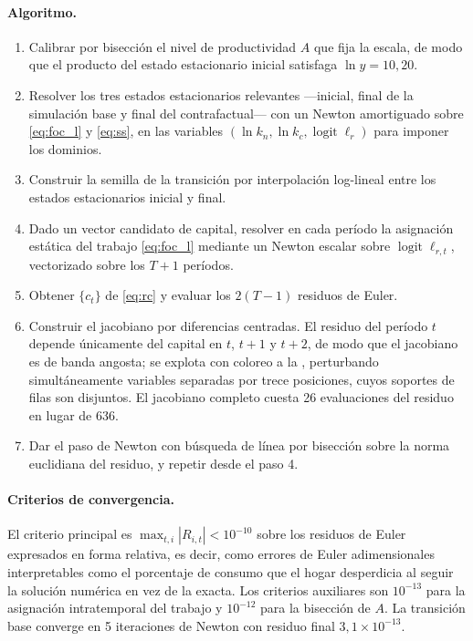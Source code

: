 \documentclass[12pt,letterpaper]{article}
\newcommand{\lr}{\ell_{r}}
\newcommand{\lrt}{\ell_{r,t}}
\begin{document}
\paragraph{Algoritmo.}
\begin{enumerate}\setlength{\itemsep}{0pt}
\item Calibrar por bisección el nivel de productividad $A$ que fija la escala, de modo
que el producto del estado estacionario inicial satisfaga $\ln y = 10{,}20$.
\item Resolver los tres estados estacionarios relevantes —inicial, final de la
simulación base y final del contrafactual— con un Newton amortiguado sobre
\eqref{eq:foc_l} y \eqref{eq:ss}, en las variables $(\ln k_{n}, \ln k_{c},
\operatorname{logit}\lr)$ para imponer los dominios.
\item Construir la semilla de la transición por interpolación log-lineal entre los
estados estacionarios inicial y final.
\item Dado un vector candidato de capital, resolver en cada período la asignación
estática del trabajo \eqref{eq:foc_l} mediante un Newton escalar sobre
$\operatorname{logit}\lrt$, vectorizado sobre los $T+1$ períodos.
\item Obtener $\{c_t\}$ de \eqref{eq:rc} y evaluar los $2(T-1)$ residuos de Euler.
\item Construir el jacobiano por diferencias centradas. El residuo del período $t$
depende únicamente del capital en $t$, $t+1$ y $t+2$, de modo que el jacobiano es de
banda angosta; se explota con coloreo a la \citet{curtis1974}, perturbando
simultáneamente variables separadas por trece posiciones, cuyos soportes de filas son
disjuntos. El jacobiano completo cuesta 26 evaluaciones del residuo en lugar de 636.
\item Dar el paso de Newton con búsqueda de línea por bisección sobre la norma
euclidiana del residuo, y repetir desde el paso 4.
\end{enumerate}

\paragraph{Criterios de convergencia.}
El criterio principal es $\max_{t,i}|R_{i,t}|<10^{-10}$ sobre los residuos de Euler
expresados en forma relativa, es decir, como errores de Euler adimensionales
interpretables como el porcentaje de consumo que el hogar desperdicia al seguir la
solución numérica en vez de la exacta. Los criterios auxiliares son $10^{-13}$ para la
asignación intratemporal del trabajo y $10^{-12}$ para la bisección de $A$. La
transición base converge en 5 iteraciones de Newton con residuo final
$3{,}1\times10^{-13}$.
\end{document}
